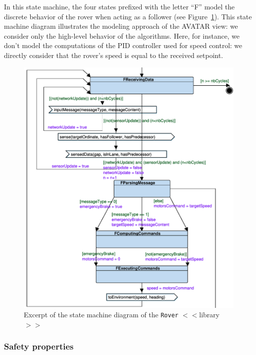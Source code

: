 \documentclass{article}
\begin{document}
In this state machine, the four states prefixed with the letter ``F'' model the discrete behavior of the rover when acting as a follower (see Figure~\ref{fig:roversmd}). This state machine diagram illustrates the modeling approach of the AVATAR view: we consider only the high-level behavior of the algorithms. Here, for instance, we don't model the computations of the PID controller used for speed control: we directly consider that the rover's speed is equal to the received setpoint.

\begin{figure}
	\centering
	\includegraphics[scale=.6]{figures/roverfsm.pdf}
	\caption{Excerpt of the state machine diagram of the \texttt{Rover} $<<$library$>>$}
	\label{fig:roversmd}
\end{figure}

\subsubsection{Safety properties}
\end{document}
